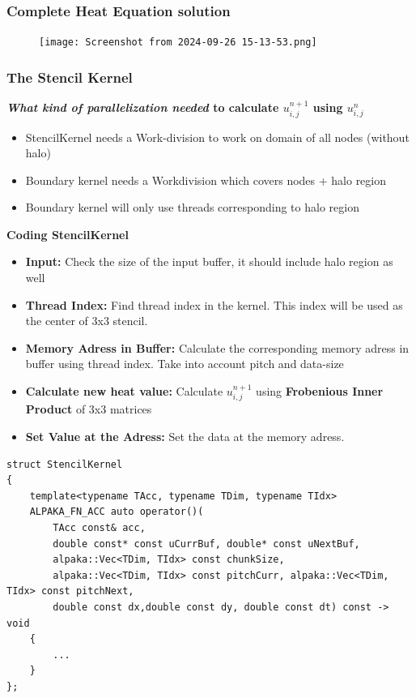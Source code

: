 \documentclass[9pt]{beamer}
\begin{document}
\begin{frame}
\frametitle{Complete Heat Equation solution}
\vspace{-0.73\baselineskip}
\begin{figure}
    \centering
    \texttt{[image: Screenshot from 2024-09-26 15-13-53.png]}
\end{figure}
\end{frame}


\begin{frame}[fragile]
\frametitle{The Stencil Kernel}
\scriptsize
 \textbf{\textit{What kind of parallelization needed} to calculate  $u_{i,j}^{n+1}$ using $u_{i,j}^{n}$ }


    \begin{itemize}
        \item StencilKernel needs a Work-division to work on domain of all nodes (without halo)
        \item Boundary kernel needs a Workdivision which covers nodes + halo region
        \item Boundary kernel will only use threads corresponding to halo region
    \end{itemize}


\textbf{Coding StencilKernel }


    \begin{itemize}
    \item \textbf{Input:} Check the size of the input buffer, it should include halo region as well
    \item \textbf{Thread Index:} Find thread index in the kernel. This index will be used as the center of 3x3 stencil.
    \item \textbf{Memory Adress in Buffer:} Calculate the corresponding memory adress in buffer using thread index. Take into account pitch and data-size
    \item \textbf{Calculate new heat value:} Calculate $u_{i,j}^{n+1}$ using \textbf{Frobenious Inner Product} of 3x3 matrices
    \item \textbf{Set Value at the Adress:} Set the data at the memory adress.
    \end{itemize}
    \lstset{basicstyle=\ttfamily\tiny}
    \begin{lstlisting}
struct StencilKernel
{
    template<typename TAcc, typename TDim, typename TIdx>
    ALPAKA_FN_ACC auto operator()(
        TAcc const& acc,
        double const* const uCurrBuf, double* const uNextBuf,
        alpaka::Vec<TDim, TIdx> const chunkSize,
        alpaka::Vec<TDim, TIdx> const pitchCurr, alpaka::Vec<TDim, TIdx> const pitchNext,
        double const dx,double const dy, double const dt) const -> void
    {
        ...
    }
};
    \end{lstlisting}
\end{frame}
\end{document}
